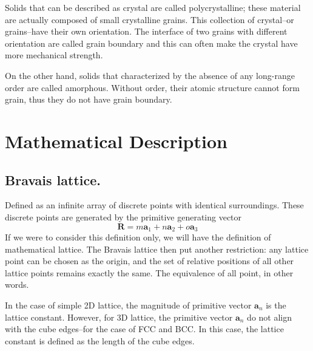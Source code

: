 \documentclass[../../../main.tex]{subfiles}
\begin{document}
Solids that can be described as crystal are called polycrystalline; these material are actually composed of small crystalline grains.
This collection of crystal--or grains--have their own orientation.
The interface of two grains with different orientation are called grain boundary and this can often make the crystal have more mechanical strength.

On the other hand, solids that  characterized by the absence of any long-range order are called amorphous. 
Without order, their atomic structure cannot form grain, thus they do not have grain boundary.

\section{Mathematical Description}
\subsection{Bravais lattice.} 
Defined as an infinite array of discrete points with identical surroundings. 
These discrete points are generated by the primitive generating vector
\begin{equation*}
    \mathbf{R} =m \mathbf{a }_1+n \mathbf{a }_2 +o \mathbf{a }_3
\end{equation*}
If we were to consider this definition only, we will have the definition of mathematical lattice.
The Bravais lattice then put another restriction: any lattice point can be chosen as the origin, and the set of relative positions of all other lattice points remains exactly the same.
The equivalence of all point, in other words.

In the case of simple 2D lattice, the magnitude of primitive vector $\mathbf{a }_n$ is the lattice constant.
However, for 3D lattice, the primitive vector $\mathbf{a }_n$ do not align with the cube edges--for the case of FCC and BCC.
In this case, the lattice constant is defined as the length of the cube edges.
\end{document}
